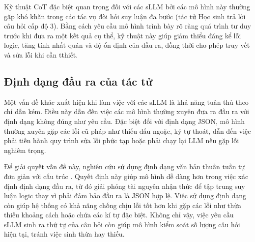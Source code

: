 Kỹ thuật CoT đặc biệt quan trọng đối với các sLLM bởi các mô hình này thường gặp khó khăn trong các tác vụ đòi hỏi suy luận đa bước (tác tử {Học sinh} trả lời câu hỏi cấp độ 3). Bằng cách yêu cầu mô hình trình bày rõ ràng quá trình tư duy trước khi đưa ra một kết quả cụ thể, kỹ thuật này giúp giảm thiểu đáng kể lỗi logic, tăng tính nhất quán và độ ổn định của đầu ra, đồng thời cho phép truy vết và sửa lỗi khi cần tthiết.

\subsection{Định dạng đầu ra của tác tử}

Một vấn đề khác xuất hiện khi làm việc với các sLLM là khả năng tuân thủ theo chỉ dẫn kém. Điều này dẫn đến việc các mô hình thường xuyên đưa ra đầu ra với định dạng không đúng như yêu cầu. Đặc biệt đối với định dạng JSON, mô hình thường xuyên gặp các lỗi cũ pháp như thiếu dấu ngoặc, ký tự thoát, dẫn đến việc phải tiến hành quy trình sửa lỗi phức tạp hoặc phải chạy lại LLM nếu gặp lỗi nghiêm trọng\cite{galeone2026correct}.

Để giải quyết vấn đề này, nghiên cứu sử dụng định dạng văn bản thuần tuần tự đơn giản với cấu trúc . Quyết định này giúp mô hình dễ dàng hơn trong việc xác định định dạng đầu ra, từ đó giải phóng tài nguyên nhận thức để tập trung suy luận logic thay vì phải đảm bảo đầu ra là JSON hợp lệ. Việc sử dụng định dạng   còn giúp hệ thống có khả năng chống chịu lỗi tốt hơn khi gặp các lỗi như thừa thiếu khoảng cách hoặc chứa các kí tự đặc biệt. Không chỉ vậy, việc yêu cầu sLLM sinh ra thứ tự của câu hỏi còn giúp mô hình kiểm soát số lượng câu hỏi hiện tại, tránh việc sinh thừa hay thiếu.



